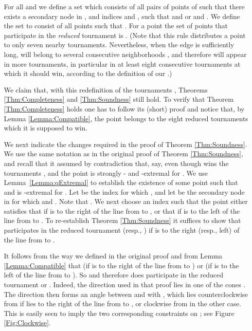 \documentclass[letter,11pt]{article}
\begin{document}
For all  and  we define a set  which
consists of all pairs  of points of  such that there exists a
secondary node  in , and indices  and , such that  and
 or  
and .  We define the set  to consist of
all points  such that  .
For a point  the set of points that participate in the 
{\em reduced} tournament  is 
.
(Note that this rule distributes a point  to only seven nearby tournaments. Nevertheless, when the edge  is sufficiently long,  will belong to several consecutive neighborhoods , and therefore will appear in more tournaments, in particular in at least eight consecutive tournaments at which it should win, according to the definition of our .)


We claim that, with this redefinition of the tournaments
, Theorems \ref{Thm:Completeness} and \ref{Thm:Soundness} still hold.
To verify that  Theorem \ref{Thm:Completeness} holds one has to follow its (short) proof and
notice that, by Lemma 
\ref{Lemma:Compatible}, the point   belongs to the eight reduced tournaments 
which it is supposed to win.

We next indicate the changes required in the proof of Theorem
\ref{Thm:Soundness}. We use the same notation as in the original
proof of Theorem \ref{Thm:Soundness}, and recall that it assumed by contradiction that, say,
 even though  wins the tournaments
,
and the point  is strongly - and -extremal for
. 
We use
Lemma~\ref{Lemma:qExtremal} to establish the existence of some point
 such that  and  is
-extremal for .  Let  be the index for which , and let  be the secondary node in  for which 
and .  Note that .  We next choose an
 index  such that the point  either satisfies 
that
 if  is to the
right of the line from  to ,  or that
 if  is to the
left of the line from  to .  To re-establish Theorem \ref{Thm:Soundness} it suffices to show that
 participates in the reduced tournament  (resp., ) if  is to the
right (resp., left) of the line from  to .


It follows from the way we defined  in the original proof and from Lemma \ref{Lemma:Compatible} 
that  
(if  is to the
right of the line from  to )
or  (if  is to the
left of the line from  to ). 
So   and therefore  does participate in the reduced tournament  or .
Indeed, the direction  used in that proof lies in one of the cones . The direction  then forms an angle between  and  with , which lies counterclockwise from  if  lies to the right of the line from  to , or clockwise from  in the other case. This is easily seen to imply the two corresponding constraints on ; see Figure \ref{Fig:Clockwise}.
\end{document}
